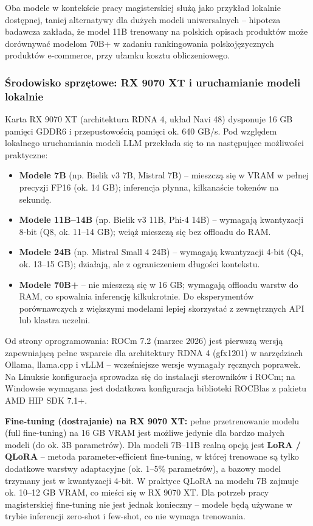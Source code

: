 \documentclass[12pt,a4paper]{article}
\newcommand{\topicsection}[1]{\subsubsection*{#1}}
\begin{document}
Oba modele w kontekście pracy magisterskiej służą jako przykład lokalnie dostępnej, taniej alternatywy dla dużych modeli uniwersalnych -- hipoteza badawcza zakłada, że model 11B trenowany na polskich opisach produktów może dorównywać modelom 70B+ w zadaniu rankingowania polskojęzycznych produktów e-commerce, przy ułamku kosztu obliczeniowego.

\topicsection{Środowisko sprzętowe: RX 9070 XT i uruchamianie modeli lokalnie}

Karta RX 9070 XT (architektura RDNA 4, układ Navi 48) dysponuje 16 GB pamięci GDDR6 i przepustowością pamięci ok. 640 GB/s. Pod względem lokalnego uruchamiania modeli LLM przekłada się to na następujące możliwości praktyczne:

\begin{itemize}
    \item \textbf{Modele 7B} (np. Bielik v3 7B, Mistral 7B) -- mieszczą się w VRAM w pełnej precyzji FP16 (ok. 14 GB); inferencja płynna, kilkanaście tokenów na sekundę.
    \item \textbf{Modele 11B--14B} (np. Bielik v3 11B, Phi-4 14B) -- wymagają kwantyzacji 8-bit (Q8, ok. 11--14 GB); wciąż mieszczą się bez offloadu do RAM.
    \item \textbf{Modele 24B} (np. Mistral Small 4 24B) -- wymagają kwantyzacji 4-bit (Q4, ok. 13--15 GB); działają, ale z ograniczeniem długości kontekstu.
    \item \textbf{Modele 70B+} -- nie mieszczą się w 16 GB; wymagają offloadu warstw do RAM, co spowalnia inferencję kilkukrotnie. Do eksperymentów porównawczych z większymi modelami lepiej skorzystać z zewnętrznych API lub klastra uczelni.
\end{itemize}

Od strony oprogramowania: ROCm 7.2 (marzec 2026) jest pierwszą wersją zapewniającą pełne wsparcie dla architektury RDNA 4 (gfx1201) w narzędziach Ollama, llama.cpp i vLLM -- wcześniejsze wersje wymagały ręcznych poprawek. Na Linuksie konfiguracja sprowadza się do instalacji sterowników i ROCm; na Windowsie wymagana jest dodatkowa konfiguracja biblioteki ROCBlas z pakietu AMD HIP SDK 7.1+.

\textbf{Fine-tuning (dostrajanie) na RX 9070 XT:} pełne przetrenowanie modelu (full fine-tuning) na 16 GB VRAM jest możliwe jedynie dla bardzo małych modeli (do ok. 3B parametrów). Dla modeli 7B--11B realną opcją jest \textbf{LoRA / QLoRA} -- metoda parameter-efficient fine-tuning, w której trenowane są tylko dodatkowe warstwy adaptacyjne (ok. 1--5\% parametrów), a bazowy model trzymany jest w kwantyzacji 4-bit. W praktyce QLoRA na modelu 7B zajmuje ok. 10--12 GB VRAM, co mieści się w RX 9070 XT. Dla potrzeb pracy magisterskiej fine-tuning nie jest jednak konieczny -- modele będą używane w trybie inferencji zero-shot i few-shot, co nie wymaga trenowania.
\end{document}
